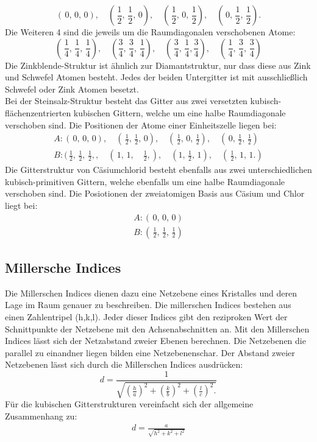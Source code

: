 $$(\,0,\,0,\,0), \quad (\,\frac{1}{2},\, \frac{1}{2} ,\, 0), \quad (\, \frac{1}{2}, \,0 ,\, \frac{1}{2}),
\quad (\,0, \, \frac{1}{2} , \, \frac{1}{2}).$$
Die Weiteren 4 sind die jeweils um die Raumdiagonalen verschobenen Atome:
$$ (\, \frac{1}{4},\, \frac{1}{4}, \, \frac{1}{4}), \quad (\frac{3}{4}, \, \frac{3}{4}, \, \frac{1}{4}),
\quad (\, \frac{3}{4}, \, \frac{1}{4}, \frac{3}{4}), \quad (\,\frac{1}{4},\,  \frac{3}{4}, \, \frac{3}{4}) $$
Die Zinkblende-Struktur ist ähnlich zur Diamantstruktur, nur dass diese aus
Zink und Schwefel Atomen besteht. Jedes der beiden Untergitter
ist mit ausschließlich Schwefel oder Zink Atomen besetzt.\\
Bei der Steinsalz-Struktur besteht das Gitter aus zwei versetzten kubisch-flächenzentrierten
kubischen Gittern, welche um eine halbe Raumdiagonale verschoben sind. Die
Positionen der Atome einer Einheitszelle liegen bei:
\begin{align}
    A:(\,0,\,0,\,0), \quad (\,\frac{1}{2},\, \frac{1}{2} ,\, 0), \quad (\, \frac{1}{2}, \,0 ,\, \frac{1}{2}),
    \quad (\,0, \, \frac{1}{2} , \, \frac{1}{2}) \\
    B:(\,\frac{1}{2},\,\frac{1}{2},\,\frac{1}{2},, \quad (\,1 , \, 1 , \quad\frac{1}{2},)
    ,\quad (1, \,\frac{1}{2}, \,1),\quad (\,\frac{1}{2}, \, 1, \,1.)
\end{align}
Die Gitterstruktur von Cäsiumchlorid besteht ebenfalls aus zwei unterschiedlichen
kubisch-primitiven Gittern, welche ebenfalls um eine halbe Raumdiagonale
verschoben sind. Die Posiotionen der zweiatomigen Basis aus Cäsium und Chlor liegt bei:
\begin{align}
A:(\,0 , \, 0 , \, 0)\\
B:(\, \frac{1}{2},\, \frac{1}{2},\, \frac{1}{2})
\end{align}
\subsection{Millersche Indices}

Die Millerschen Indices dienen dazu eine Netzebene eines Kristalles und deren
Lage im Raum genauer zu beschreiben. Die millerschen Indices bestehen aus einen Zahlentripel
(h,k,l). Jeder dieser Indices gibt den reziproken Wert der Schnittpunkte der
Netzebene mit den Achsenabschnitten an. Mit den Millerschen Indices lässt sich der
Netzabstand zweier Ebenen berechnen. Die Netzebenen die parallel zu einandner
liegen bilden eine Netzebenenschar. Der Abstand zweier Netzebenen lässt sich
durch die Millerschen Indices ausdrücken:
$$ d=\frac{1}{\sqrt{
\left(\frac{h}{a} \right)^2 + \left(\frac{k}{b} \right)^2 + \left(\frac{l}{c} \right)^2.
}}
$$
Für die kubischen Gitterstrukturen vereinfacht sich der allgemeine Zusammenhang zu:
\begin{align}
d=\frac{a}{\sqrt{h^2 + k^2 + l^2}}
\label{gitti}
\end{align}
